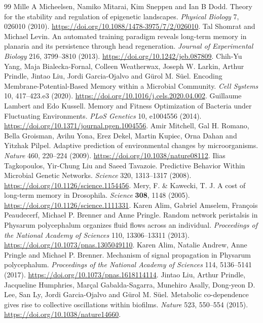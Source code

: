 \begin{thebibliography}{99}
 Mille A Micheelsen, Namiko Mitarai, Kim Sneppen and Ian B Dodd. Theory for the stability and regulation of epigenetic landscapes. \emph{Physical Biology} 7, 026010 (2010). \url{https://doi.org/10.1088/1478-3975/7/2/026010}.
 Tal Shomrat and Michael Levin. An automated training paradigm reveals long-term memory in planaria and its persistence through head regeneration. \emph{Journal of Experimental Biology} 216, 3799--3810 (2013). \url{https://doi.org/10.1242/jeb.087809}.
 Chih-Yu Yang, Maja Bialecka-Fornal, Colleen Weatherwax, Joseph W. Larkin, Arthur Prindle, Jintao Liu, Jordi Garcia-Ojalvo and G\"{u}rol M. S\"{u}el. Encoding Membrane-Potential-Based Memory within a Microbial Community. \emph{Cell Systems} 10, 417--423.e3 (2020). \url{https://doi.org/10.1016/j.cels.2020.04.002}.
 Guillaume Lambert and Edo Kussell. Memory and Fitness Optimization of Bacteria under Fluctuating Environments. \emph{PLoS Genetics} 10, e1004556 (2014). \url{https://doi.org/10.1371/journal.pgen.1004556}.
 Amir Mitchell, Gal H. Romano, Bella Groisman, Avihu Yona, Erez Dekel, Martin Kupiec, Orna Dahan and Yitzhak Pilpel. Adaptive prediction of environmental changes by microorganisms. \emph{Nature} 460, 220--224 (2009). \url{https://doi.org/10.1038/nature08112}.
 Ilias Tagkopoulos, Yir-Chung Liu and Saeed Tavazoie. Predictive Behavior Within Microbial Genetic Networks. \emph{Science} 320, 1313--1317 (2008). \url{https://doi.org/10.1126/science.1154456}.
 Mery, F. \& Kawecki, T. J. A cost of long-term memory in Drosophila. \emph{Science} \textbf{308}, 1148 (2005). \url{https://doi.org/10.1126/science.1111331}.
 Karen Alim, Gabriel Amselem, Fran\c{c}ois Peaudecerf, Michael P. Brenner and Anne Pringle. Random network peristalsis in Physarum polycephalum organizes fluid flows across an individual. \emph{Proceedings of the National Academy of Sciences} 110, 13306--13311 (2013). \url{https://doi.org/10.1073/pnas.1305049110}.
 Karen Alim, Natalie Andrew, Anne Pringle and Michael P. Brenner. Mechanism of signal propagation in Physarum polycephalum. \emph{Proceedings of the National Academy of Sciences} 114, 5136--5141 (2017). \url{https://doi.org/10.1073/pnas.1618114114}.
 Jintao Liu, Arthur Prindle, Jacqueline Humphries, Mar\c{c}al Gabalda-Sagarra, Munehiro Asally, Dong-yeon D. Lee, San Ly, Jordi Garcia-Ojalvo and G\"{u}rol M. S\"{u}el. Metabolic co-dependence gives rise to collective oscillations within biofilms. \emph{Nature} 523, 550--554 (2015). \url{https://doi.org/10.1038/nature14660}.

\end{thebibliography}
